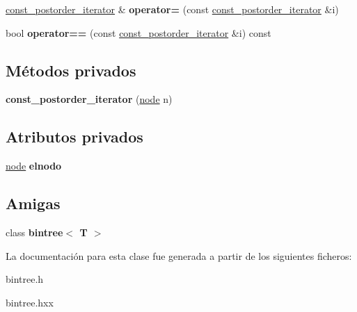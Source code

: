 \begin{DoxyCompactItemize}
\item 
\hypertarget{classbintree_1_1const__postorder__iterator_a067e16ec2ac44c724491315e67d70ca9}{}\hyperlink{classbintree_1_1const__postorder__iterator}{const\+\_\+postorder\+\_\+iterator} \& {\bfseries operator=} (const \hyperlink{classbintree_1_1const__postorder__iterator}{const\+\_\+postorder\+\_\+iterator} \&i)\label{classbintree_1_1const__postorder__iterator_a067e16ec2ac44c724491315e67d70ca9}

\item 
\hypertarget{classbintree_1_1const__postorder__iterator_a2f2c501004e04fa3b6e6750d13eac0d2}{}bool {\bfseries operator==} (const \hyperlink{classbintree_1_1const__postorder__iterator}{const\+\_\+postorder\+\_\+iterator} \&i) const \label{classbintree_1_1const__postorder__iterator_a2f2c501004e04fa3b6e6750d13eac0d2}

\end{DoxyCompactItemize}
\subsection*{Métodos privados}
\begin{DoxyCompactItemize}
\item 
\hypertarget{classbintree_1_1const__postorder__iterator_a212507ba25b412e21ed3bf514ebb2996}{}{\bfseries const\+\_\+postorder\+\_\+iterator} (\hyperlink{classbintree_1_1node}{node} n)\label{classbintree_1_1const__postorder__iterator_a212507ba25b412e21ed3bf514ebb2996}

\end{DoxyCompactItemize}
\subsection*{Atributos privados}
\begin{DoxyCompactItemize}
\item 
\hypertarget{classbintree_1_1const__postorder__iterator_aa39f384033a19a3e174f8c2fdf1e7b1a}{}\hyperlink{classbintree_1_1node}{node} {\bfseries elnodo}\label{classbintree_1_1const__postorder__iterator_aa39f384033a19a3e174f8c2fdf1e7b1a}

\end{DoxyCompactItemize}
\subsection*{Amigas}
\begin{DoxyCompactItemize}
\item 
\hypertarget{classbintree_1_1const__postorder__iterator_a300e602ae13bd21fa092c5a5899e9eda}{}class {\bfseries bintree$<$ T $>$}\label{classbintree_1_1const__postorder__iterator_a300e602ae13bd21fa092c5a5899e9eda}

\end{DoxyCompactItemize}


La documentación para esta clase fue generada a partir de los siguientes ficheros\+:\begin{DoxyCompactItemize}
\item 
bintree.\+h\item 
bintree.\+hxx\end{DoxyCompactItemize}
